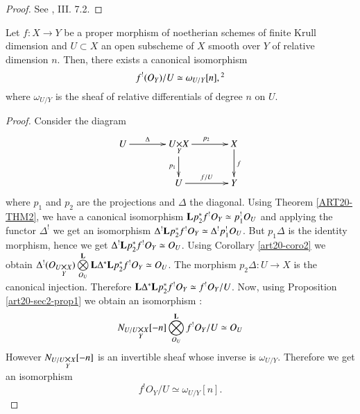 \begin{proof}
See \cite{art20-key1}, III. 7.2.
\end{proof}

\begin{theorem}\label{art20-thm3}
Let $f:X\to Y$ be a proper morphism of noetherian schemes of finite Krull dimension and $U\subset X$ an open subscheme of $X$ smooth over $Y$ of relative dimension $n$. Then, there exists a canonical isomorphism
$$
f^{!}(O_{Y})/U\simeq \omega_{U/Y}[n],\footnotemark[2]
$$
where $\omega_{U/Y}$ is the sheaf of relative differentials of degree $n$ on $U$.
\end{theorem}

\begin{proof}
Consider the diagram
\[
\xymatrix@C=1.3cm{
U\ar[r]^-{\Delta} & \fprod{U}{X}{Y}\ar[d]_-{p_{1}}\ar[r]^{p_{2}} & X\ar[d]^{f}\\
 & U\ar[r]^-{f/U} & Y
}
\]\pageoriginale
where $p_{1}$ and $p_{2}$ are the projections and $\Delta$ the diagonal. Using Theorem \ref{ART20-THM2}, we have a canonical isomorphism $\mathbf{L} p^{*}_{2}f^{!}O_{Y}\simeq p^{!}_{1}O_{U}$ and applying the functor $\Delta^{!}$ we get an isomorphism $\Delta^{!}\mathbf{L} p^{*}_{2}f^{!}O_{Y}\simeq \Delta^{!}p^{!}_{1}O_{U}$. But $p_{1}\Delta$ is the identity morphism, hence we get $\Delta^{!}\mathbf{L} p^{*}_{2}f^{!}O_{Y}\simeq O_{U}$. Using Corollary \ref{art20-coro2} we obtain $\Delta^{!}(O_{\fprod{U}{X}{Y}})\bigotimes\limits^{\bfL}_{O_{U}}\bfL\Delta^{*}\bfL p^{*}_{2}f^{!}O_{Y}\simeq O_{U}$. The morphism $p_{2}\Delta  : U\to X$ is the canonical injection. Therefore $\mathbf{L} \Delta^{*}\mathbf{L} p^{*}_{2}f^{!}O_{Y}\simeq f^{!}O_{Y}/U$. Now, using Proposition \ref{art20-sec2-prop1} we obtain an isomorphism :
$$
N_{\fprod{U/U}{X}{Y}}[-n]\bigotimes\limits^{\bfL}_{O_{U}}f^{!}O_{Y}/U\simeq O_{U}
$$
However $N_{\fprod{U/U}{X}{Y}}[-n]$ is an invertible sheaf whose inverse is $\omega_{U/Y}$. Therefore we get an isomorphism
$$
f^{!}O_{Y}/U\simeq \omega_{U/Y}[n].
$$


\end{proof}
